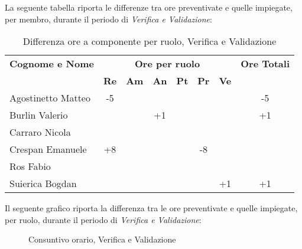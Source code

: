 \noindent La seguente tabella riporta le differenze tra ore preventivate e quelle impiegate, per membro, durante il periodo di \textit{Verifica e Validazione}: 

\begin{table}[h]
	\centering
	\begin{tabular}{|l|c|c|c|c|c|c|c|}
		\toprule
		\textbf{Cognome e Nome} & \multicolumn{6}{c}{\textbf{Ore per ruolo}} & \textbf{Ore Totali} \\
		& \textbf{Re} & \textbf{Am} & \textbf{An} & \textbf{Pt} & \textbf{Pr} & \textbf{Ve} & \\
		
		\midrule
		Agostinetto Matteo & -5 & & & & & & -5 \\
		Burlin Valerio & & & +1 & & & & +1 \\ 
		Carraro Nicola & & & & & & & \\
		Crespan Emanuele & +8 & & & & -8 & & \\
		Ros Fabio & & & & & & & \\
		Suierica Bogdan & & & & & & +1 & +1 \\
		
		\bottomrule
	\end{tabular}
	\caption{Differenza ore a componente per ruolo, Verifica e Validazione}
\end{table}

\newpage
\noindent Il seguente grafico riporta la differenza tra le ore preventivate e quelle impiegate, per ruolo, durante il periodo di \textit{Verifica e Validazione}:

\begin{figure}[h]
	\centering
	\caption{Consuntivo orario, Verifica e Validazione}
\end{figure}

